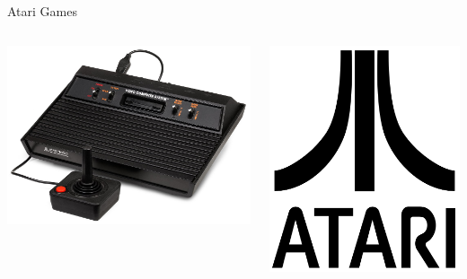 \documentclass{beamer}
\begin{document}
\begin{frame}{Atari Games}

\begin{columns}
	\centering
	\includegraphics[scale = 0.15]{Images/Atari-2600-Console.jpg}

\centering
\includegraphics[scale = 0.1]{Images/atari_logo}
\end{columns}

\end{frame}
\end{document}
